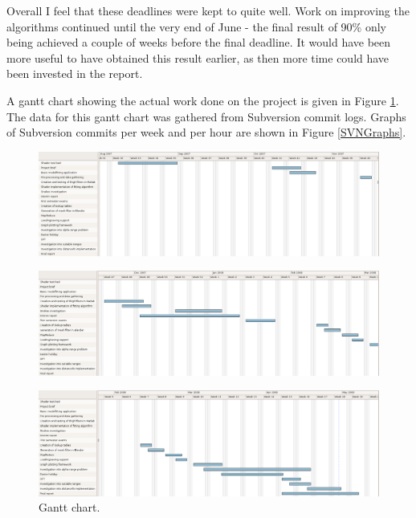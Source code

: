 Overall I feel that these deadlines were kept to quite well.
Work on improving the algorithms continued until the very end of June - the final result of 90\% only being achieved a couple of weeks before the final deadline.
It would have been more useful to have obtained this result earlier, as then more time could have been invested in the report.

A gantt chart showing the actual work done on the project is given in Figure \ref{GanttChart}.
The data for this gantt chart was gathered from Subversion commit logs.
Graphs of Subversion commits per week and per hour are shown in Figure \ref{SVNGraphs}.

\begin{landscape}
	\begin{figure}[p]
		\centering
		\includegraphics[width=21cm]{gantt.png}
	\end{figure}
	\begin{figure}[p]
		\centering
		\includegraphics[width=21cm]{gantt2.png}
	\end{figure}
	\begin{figure}[p]
		\centering
		\includegraphics[width=21cm]{gantt3.png}
		\caption{Gantt chart.}
		\label{GanttChart}
	\end{figure}
\end{landscape}



